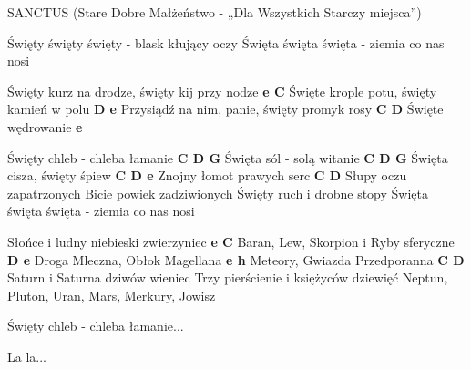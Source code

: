 \documentclass[../../../songbook.tex]{subfiles}
\begin{document}
SANCTUS	
(Stare Dobre Małżeństwo - „Dla Wszystkich Starczy miejsca”)

			
Święty święty święty - blask kłujący oczy \newline
Święta święta święta - ziemia co nas nosi \newline
	
Święty kurz na drodze, święty kij przy nodze		\textbf{e C} \newline
Święte krople potu, święty kamień w polu		\textbf{D e} \newline
Przysiądź na nim, panie, święty promyk rosy	  \textbf{C D} \newline
Święte wędrowanie					\textbf{e} \newline

	Święty chleb - chleba łamanie		\textbf{C D G} \newline
	Święta sól - solą witanie			\textbf{C D G} \newline
	Święta cisza, święty śpiew		\textbf{C D e} \newline
	Znojny łomot prawych serc		\textbf{C D} \newline
	Słupy oczu zapatrzonych
	Bicie powiek zadziwionych
	Święty ruch i drobne stopy
	Święta święta święta - ziemia co nas nosi

Słońce i ludny niebieski zwierzyniec			\textbf{e C} \newline
Baran, Lew, Skorpion i Ryby sferyczne			\textbf{D e} \newline
Droga Mleczna, Obłok Magellana			\textbf{e h} \newline
Meteory, Gwiazda Przedporanna			\textbf{C D} \newline
Saturn i Saturna dziwów wieniec
Trzy pierścienie i księżyców dziewięć
Neptun, Pluton, Uran, Mars, Merkury, Jowisz
	
	Święty chleb - chleba łamanie... \newline

La la...
\end{document}
